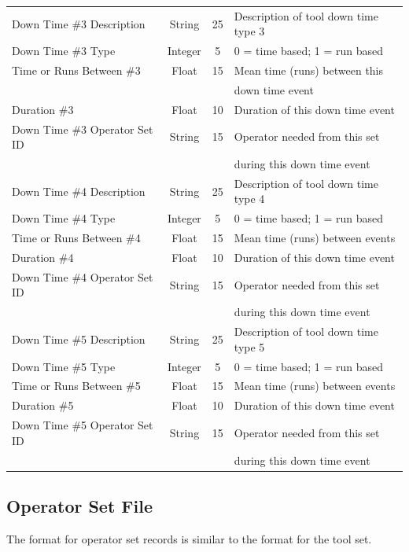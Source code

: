 \begin{center}
\begin{tabular}{|l|c|c|l|}
   Down Time \#3 Description & String & 25 & Description of tool down time
   type 3 \\
   Down Time \#3 Type & Integer & 5 & 0 = time based; 1 = run based \\
   Time or Runs Between \#3 & Float & 15 & Mean time (runs) between this \\
    & & & down time event \\
   Duration \#3 & Float & 10 & Duration of this down time event \\
   Down Time \#3 Operator Set ID & String & 15 & Operator needed from
   this set \\
    & & & during this down time event\\
   Down Time \#4 Description & String & 25 & Description of tool down time
   type 4 \\
   Down Time \#4 Type & Integer & 5 & 0 = time based; 1 = run based \\
   Time or Runs Between \#4 & Float & 15 & Mean time (runs) between events \\
   Duration \#4 & Float & 10 & Duration of this down time event \\
   Down Time \#4 Operator Set ID & String & 15 & Operator needed from
   this set \\
    & & & during this down time event\\
   Down Time \#5 Description & String & 25 & Description of tool down time
   type 5 \\
   Down Time \#5 Type & Integer & 5 & 0 = time based; 1 = run based \\
   Time or Runs Between \#5 & Float & 15 & Mean time (runs) between events \\
   Duration \#5 & Float & 10 & Duration of this down time event \\
   Down Time \#5 Operator Set ID & String & 15 & Operator needed from
   this set \\
    & & & during this down time event\\ \hline
   \end{tabular}
   \end{center}
   
   \newpage
   \subsection{Operator Set File}
   The format for operator set records is similar to the format for
   the tool set.
   
